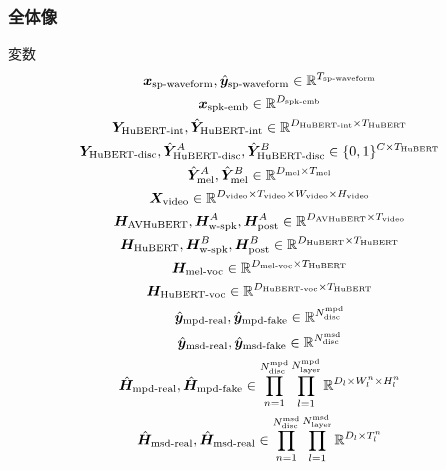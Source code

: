 \documentclass[12pt]{jarticle}
\numberwithin{equation}{section}    %
\numberwithin{figure}{section}      %
\numberwithin{table}{section}      %
\begin{document}
\subsubsection{全体像}
変数
\begin{gather}
    \bm{x}_{\text{sp-waveform}}, \hat{\bm{y}}_{\text{sp-waveform}} \in \mathbb{R}^{T_{\text{sp-waveform}}}  \\
    \bm{x}_{\text{spk-emb}} \in \mathbb{R}^{D_{\text{spk-emb}}} \\
    \bm{Y}_{\text{HuBERT-int}}, \hat{\bm{Y}}_{\text{HuBERT-int}} \in \mathbb{R}^{D_{\text{HuBERT-int}} \times T_{\text{HuBERT}}} \\
    \bm{Y}_{\text{HuBERT-disc}}, \hat{\bm{Y}}_{\text{HuBERT-disc}}^{A}, \hat{\bm{Y}}_{\text{HuBERT-disc}}^{B} \in \{0, 1\}^{C \times T_{\text{HuBERT}}} \\
    \hat{\bm{Y}}_{\text{mel}}^{A}, \hat{\bm{Y}}_{\text{mel}}^{B} \in \mathbb{R}^{D_{\text{mel}} \times T_{\text{mel}}} \\
    \bm{X}_{\text{video}} \in \mathbb{R}^{D_{\text{video}} \times T_{\text{video}} \times W_{\text{video}} \times H_{\text{video}}} \\
    \bm{H}_{\text{AVHuBERT}}, \bm{H}_{\text{w-spk}}^{A}, \bm{H}_{\text{post}}^{A} \in \mathbb{R}^{D_{\text{AVHuBERT}} \times T_{\text{video}}} \\
    \bm{H}_{\text{HuBERT}}, \bm{H}_{\text{w-spk}}^{B}, \bm{H}_{\text{post}}^{B} \in \mathbb{R}^{D_{\text{HuBERT}} \times T_{\text{HuBERT}}} \\
    \bm{H}_{\text{mel-voc}} \in \mathbb{R}^{D_{\text{mel-voc}} \times T_{\text{HuBERT}}} \\
    \bm{H}_{\text{HuBERT-voc}} \in \mathbb{R}^{D_{\text{HuBERT-voc}} \times T_{\text{HuBERT}}} \\
    \hat{\bm{y}}_{\text{mpd-real}}, \hat{\bm{y}}_{\text{mpd-fake}} \in \mathbb{R}^{N_{\text{disc}}^{\text{mpd}}}  \\
    \hat{\bm{y}}_{\text{msd-real}}, \hat{\bm{y}}_{\text{msd-fake}} \in \mathbb{R}^{N_{\text{disc}}^{\text{msd}}} \\
    \hat{\bm{H}}_{\text{mpd-real}}, \hat{\bm{H}}_{\text{mpd-fake}} \in \prod_{n = 1}^{N_{\text{disc}}^{\text{mpd}}} \prod_{l = 1}^{N_{\text{layer}}^{\text{mpd}}} \mathbb{R}^{D_{l} \times W_{l}^{n} \times H_{l}^{n}} \\
    \hat{\bm{H}}_{\text{msd-real}}, \hat{\bm{H}}_{\text{msd-real}} \in \prod_{n = 1}^{N_{\text{disc}}^{\text{msd}}} \prod_{l = 1}^{N_{\text{layer}}^{\text{msd}}} \mathbb{R}^{D_{l} \times T_{l}^{n}} \\
\end{gather}
\end{document}
